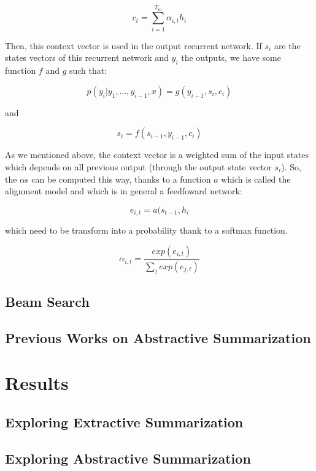 \documentclass[11pt,a4paper,oldfontcommands]{memoir}
\begin{document}
\[ c_t = \sum_{i=1}^{T_{in}} \alpha_{i,t}h_i\]

Then, this context vector is used in the output recurrent network. If $s_i$ are the states vectors of this recurrent network and $y_i$ the outputs, we have some function $f$ and $g$ such that:

\[ p(y_i|y_1,...,y_{i-1}, x) = g(y_{i-1}, s_i, c_i)\]

and

\[ s_i = f(s_{i-1}, y_{i-1}, c_i)\]

As we mentioned above, the context vector is a weighted sum of the input states which depends on all previous output (through the output state vector $s_i$). So, the $\alpha$s can be computed this way, thanks to a function $a$ which is called the alignment model and which is in general a feedfoward network:

\[ e_{i, t} = a(s_{t-1}, h_i\]

which need to be transform into a probability thank to a softmax function.

\[ \alpha_{i, t} = \frac{exp(e_{i, t})}{\sum_j exp(e_{j, t})}\]

\section{Beam Search}

\section{Previous Works on Abstractive Summarization}

\chapter{Results}

\section{Exploring Extractive Summarization}

\section{Exploring Abstractive Summarization}

\iffalse

\appendix

\chapter{Additional}

\fi

\nocite{*}


\end{document}
